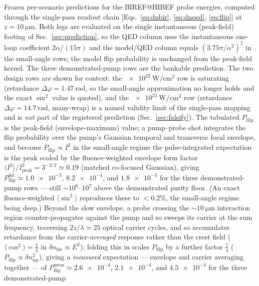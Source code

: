 \documentclass[aps,prd,twocolumn,superscriptaddress,nofootinbib,longbibliography]{revtex4-2}
\newcommand{\dnbir}{\delta n_{\mathrm{bir}}}
\newcommand{\Pflip}{P_{\mathrm{flip}}}
\begin{document}
\begin{table}[t]
  \centering
  \caption{Frozen per-scenario predictions for the BIREF@HIBEF probe energies,
  computed through the single-pass readout chain [Eqs.~\eqref{eq:dnbir},
  \eqref{eq:dnqed}, \eqref{eq:flip}] at $z=\SI{10}{\micro\meter}$. Both legs are
  evaluated on the single instantaneous (peak-field) footing of
  Sec.~\ref{sec:prediction}, so the QED column uses the instantaneous one-loop
  coefficient $2\alpha/(15\pi)$ and the model/QED column equals
  $(3.75\pi/\alpha^2)^2$ in the small-angle rows; the model flip probability is
  unchanged from the peak-field kernel. The three
  demonstrated-pump rows are the bankable prediction. The two design rows are
  shown for context: the $\SI{e22}{\watt\per\centi\meter\squared}$ row is
  saturating (retardance $\Delta\varphi=\SI{1.47}{\radian}$, so the small-angle
  approximation no longer holds and the exact $\sin^2$ value is quoted), and the
  $\SI{e23}{\watt\per\centi\meter\squared}$ row (retardance
  $\Delta\varphi=\SI{14.7}{\radian}$, many-wrap) is a named validity limit of
  the single-pass mapping and is \emph{not} part of the registered prediction
  (Sec.~\ref{sec:falsify}). The tabulated $\Pflip$ is the peak-field
  (envelope-maximum) value; a pump--probe shot integrates the flip probability
  over the pump's Gaussian temporal and transverse focal envelope, and because
  $\Pflip\propto I^2$ in the small-angle regime the pulse-integrated expectation
  is the peak scaled by the fluence-weighted envelope form factor
  $\langle I^2\rangle/I_{\mathrm{peak}}^2=3^{-3/2}\simeq0.19$ (matched co-focused
  Gaussian), giving $\Pflip^{\mathrm{int}}\simeq\num{1.0e-3}$, $\num{8.2e-4}$, and
  $\num{1.8e-3}$ for the three demonstrated-pump rows --- still
  $\sim\!10^6\text{--}10^7$ above the demonstrated purity floor. (An exact
  fluence-weighted $\langle\sin^2\rangle$ reproduces these to $<0.2\%$, the
  small-angle regime being deep.) Beyond the slow envelope, a probe crossing the
  $\sim\!\SI{10}{\micro\meter}$ interaction region counter-propagates against the
  pump and so sweeps its carrier at the sum frequency, traversing
  $2z/\lambda\simeq25$ optical carrier cycles, and so accumulates retardance from
  the carrier-\emph{averaged} response rather than the crest field
  ($\langle\cos^2\rangle=\tfrac12$ in $\dnbir\propto E^2$); folding this in scales $\Pflip$ by a further factor
  $\tfrac14$ ($\Pflip\propto\dnbir^2$), giving a \emph{measured} expectation ---
  envelope and carrier averaging together --- of $\Pflip^{\mathrm{meas}}\simeq
  \num{2.6e-4}$, $\num{2.1e-4}$, and $\num{4.5e-4}$ for the three demonstrated-pump
}
\end{table}
\end{document}
